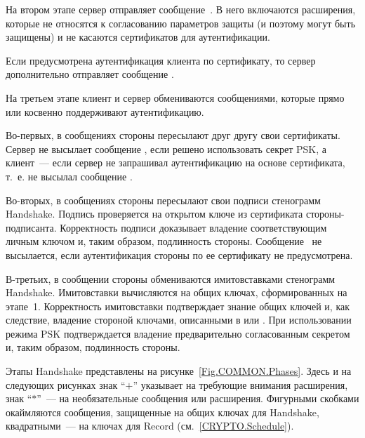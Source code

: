 На втором этапе сервер отправляет сообщение~.
В него включаются расширения, которые не относятся к согласованию параметров
защиты (и поэтому могут быть защищены) и не касаются сертификатов для 
аутентификации.

Если предусмотрена аутентификация клиента по сертификату, то сервер
дополнительно отправляет сообщение .

На третьем этапе клиент и сервер обмениваются сообщениями, которые прямо или 
косвенно поддерживают аутентификацию.

Во-первых, в сообщениях  стороны пересылают друг другу
свои сертификаты. Сервер не высылает сообщение , если
решено использовать секрет PSK, а клиент~--- если сервер не запрашивал аутентификацию 
на основе сертификата, т.~е. не высылал сообщение .

Во-вторых, в сообщениях  стороны пересылают свои
подписи стенограмм Handshake. Подпись проверяется на открытом ключе из
сертификата стороны-подписанта. Корректность подписи доказывает владение
соответствующим личным ключом и, таким образом, подлинность стороны.
%
Сообщение~ не высылается, если аутентификация
стороны по ее сертификату не предусмотрена.

В-третьих, в сообщении  стороны обмениваются
имитовставками стенограмм Handshake. Имитовставки вычисляются на общих ключах,
сформированных на этапе~1.
%
Корректность имитовставки подтверждает знание общих ключей и, как 
следствие, владение стороной ключами, описанными в  
или .
%
При использовании режима PSK подтверждается владение предварительно 
согласованным секретом и, таким образом, подлинность стороны.

Этапы Handshake представлены на рисунке~\ref{Fig.COMMON.Phases}. Здесь и на
следующих рисунках знак ``$+$'' указывает на требующие внимания расширения,
знак ``$*$''~--- на необязательные сообщения или расширения. Фигурными
скобками окаймляются сообщения, защищенные на общих ключах для Handshake,
квадратными~--- на ключах для Record (см.~\ref{CRYPTO.Schedule}).

